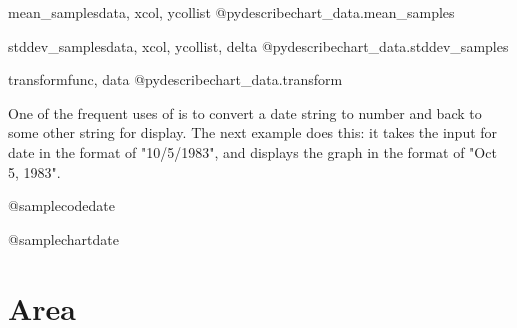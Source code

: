 \documentclass{howto}
\begin{document}
\begin{funcdesc}{mean_samples}{data, xcol, ycollist}
@pydescribe{chart_data.mean_samples}
\end{funcdesc}

\begin{funcdesc}{stddev_samples}{data, xcol, ycollist, delta}
@pydescribe{chart_data.stddev_samples}
\end{funcdesc}

\begin{funcdesc}{transform}{func, data}
@pydescribe{chart_data.transform}
\end{funcdesc}

One of the frequent uses of  is to convert a date string
to number and back to some other string for display. The next example
does this: it takes the input for date in the format of "10/5/1983", and
displays the graph in the format of "Oct 5, 1983".


@samplecode{date}

@samplechart{date}

\section{Area}
\end{document}
